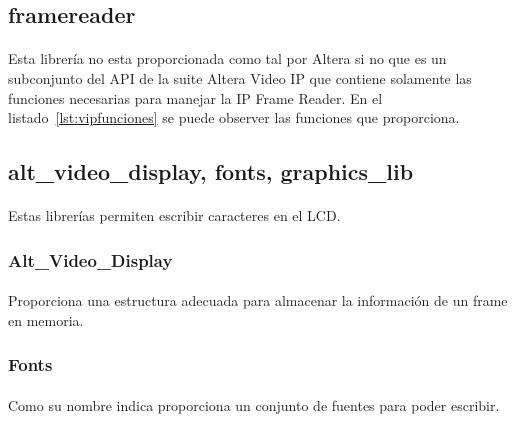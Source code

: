 \documentclass[a4paper,12pt,titlepage,final]{book}
\begin{document}






\subsection{framereader}
\paragraph{}
Esta librería no esta proporcionada como tal por Altera si no que es un subconjunto del API de la suite Altera Video IP que contiene solamente las funciones necesarias para manejar la IP Frame Reader. En el listado~\ref{lst:vipfunciones} se puede observer las funciones que proporciona.



\subsection{alt\_video\_display, fonts, graphics\_lib}
\paragraph{}
Estas librerías permiten escribir caracteres en el LCD. 

\subsubsection{Alt\_Video\_Display}
\paragraph{}
Proporciona una estructura adecuada para almacenar la información de un frame en memoria.

\subsubsection{Fonts}
\paragraph{}
Como su nombre indica proporciona un conjunto de fuentes para poder escribir.
\end{document}
